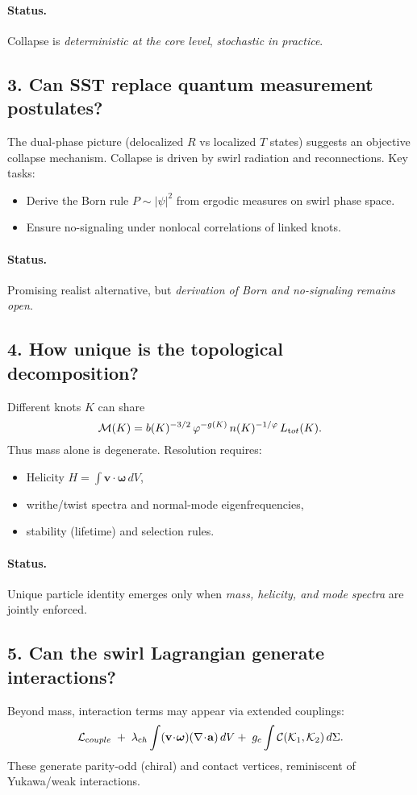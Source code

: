 \documentclass[11pt]{article}
\begin{document}
\paragraph{Status.} Collapse is \emph{deterministic at the core level}, \emph{stochastic in practice}.

\subsection*{3. Can SST replace quantum measurement postulates?}
The dual-phase picture (delocalized $R$ vs localized $T$ states) suggests an objective collapse mechanism. Collapse is driven by swirl radiation and reconnections.
Key tasks:
\begin{itemize}
\item Derive the Born rule $P\sim|\psi|^2$ from ergodic measures on swirl phase space.
\item Ensure no-signaling under nonlocal correlations of linked knots.
\end{itemize}

\paragraph{Status.} Promising realist alternative, but \emph{derivation of Born and no-signaling remains open}.

\subsection*{4. How unique is the topological decomposition?}
Different knots $K$ can share
\[
    \mathcal M(K)=b(K)^{-3/2}\,\varphi^{-g(K)}\,n(K)^{-1/\varphi}\,L_{\textrm tot}(K).
\]
Thus mass alone is degenerate. Resolution requires:
\begin{itemize}
\item Helicity $H=\int \mathbf v\!\cdot\!\boldsymbol\omega\,dV$,
\item writhe/twist spectra and normal-mode eigenfrequencies,
\item stability (lifetime) and selection rules.
\end{itemize}

\paragraph{Status.} Unique particle identity emerges only when \emph{mass, helicity, and mode spectra} are jointly enforced.

\subsection*{5. Can the swirl Lagrangian generate interactions?}
Beyond mass, interaction terms may appear via extended couplings:
\[
    \mathcal L_{\textrm couple}\;+\;\lambda_{\textrm ch}\int (\mathbf v\!\cdot\!\boldsymbol\omega)(\nabla\!\cdot\!\mathbf a)\,dV
    +\;g_c \int \mathcal C(\mathcal K_1,\mathcal K_2)\,d\Sigma.
\]
These generate parity-odd (chiral) and contact vertices, reminiscent of Yukawa/weak interactions.
\end{document}
